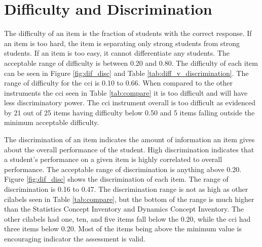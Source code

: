 \FloatBarrier
\section{Difficulty and Discrimination}

The difficulty of an item is the fraction of students with the correct response. If an item is too hard, the item is separating only strong students from strong students. If an item is too easy, it cannot differentiate any students. The acceptable range of difficulty is between 0.20 and 0.80. The difficulty of each item can be seen in Figure \ref{fig:dif_disc} and Table \ref{tab:diff_v_discrimination}. The range of difficulty for the \gls{cci} is 0.10 to 0.66. When compared to the other instruments the \gls{cci} seen in Table \ref{tab:compare} it is too difficult and will have less discriminatory power. The \gls{cci} instrument overall is too difficult as evidenced by 21 out of 25 items having difficulty below 0.50 and 5 items falling outside the minimum acceptable difficulty. 

The discrimination of an item indicates the amount of information an item gives about the overall performance of the student. High discrimination indicates that a student's performance on a given item is highly correlated to overall performance. The acceptable range of discrimination is anything above 0.20.  Figure \ref{fig:dif_disc} shows the discrimination of each item. The range of discrimination is 0.16 to 0.47. The discrimination range is not as high as other \glspl{cilabel} seen in Table \ref{tab:compare}, but the bottom of the range is much higher than the Statistics Concept Inventory and Dynamics Concept Inventory. The other \glspl{cilabel} had one, ten, and five items fall below the 0.20, while the \gls{cci} had three items below 0.20. Most of the items being above the minimum value is encouraging indicator the assessment is valid.   

\iffalse
\iflong
The correlation coefficient can be calculated for each item to quantify how similar the item fits in with the rest of the items. The correlation for each item can be seen in Figure \ref{fig:correlation}. 


\begin{figure}[!hbp]
    \begin{center}
    \advance\leftskip-3cm
    \advance\rightskip-3cm
    \texttt{[image: images/correlation.png]}
    \caption{Correlation}
    \label{fig:correlation}
\end{center}
\end{figure}
\fi
\fi

